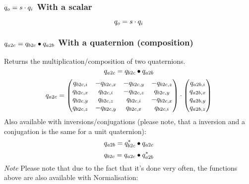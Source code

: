 \subsubsection*{$q_{o} = s \cdot q_{i}$ With a scalar}
\begin{equation}
	q_{o} = s \cdot q_{i}
\end{equation}

\subsubsection*{$q_{a2c} = q_{b2c} \bullet q_{a2b}$ With a quaternion (composition)}
Returns the multiplication/composition of two quaternions.
\begin{equation}
q_{a2c} = q_{b2c} \bullet q_{a2b}
\end{equation}
\begin{equation}
q_{a2c} = \begin{pmatrix}
q_{b2c,i} & -q_{b2c,x} & -q_{b2c,y} & -q_{b2c,z} \\
q_{b2c,x} &  q_{b2c,i} & -q_{b2c,z} &  q_{b2c,y} \\
q_{b2c,y} &  q_{b2c,z} &  q_{b2c,i} & -q_{b2c,x} \\
q_{b2c,z} & -q_{b2c,y} &  q_{b2c,x} &  q_{b2c,i}
\end{pmatrix}\cdot \begin{pmatrix}
q_{a2b,i}\\q_{a2b,x}\\q_{a2b,y}\\q_{a2b,z}
\end{pmatrix}
\end{equation}
Also available with inversions/conjugations (please note, that a inversion and a conjugation is the same for a unit quaternion):
\begin{equation}
q_{a2b} = q_{b2c}^* \bullet q_{a2c}
\end{equation}
\begin{equation}
q_{b2c} = q_{a2c} \bullet q_{a2b}^*
\end{equation}
\emph{Note}
Please note that due to the fact that it's done very often, the functions above are also available with Normalisation:

